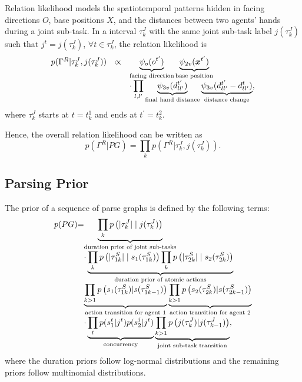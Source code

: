 \documentclass[letterpaper, 10 pt, conference]{ieeeconf}  %
\def \xb{\bm{x}} %
\begin{document}
Relation likelihood models the spatiotemporal patterns hidden in facing directions $O$, base positions $X$, and the distances between two agents' hands during a joint sub-task. In a interval $\tau_k^J$ with the same joint sub-task label $j(\tau_k^J)$ such that $j^t = j(\tau_k^J)$, $\forall t \in \tau_k^J$, the relation likelihood is
\begin{equation}
\begin{array}{lcl}
\setlength{\arraycolsep}{0pt}
p(\Gamma^R | \tau_k^J, j(\tau_k^J)) &\propto& \displaystyle \underbrace{\psi_{o}(o^{t^\prime})}_{\text{facing direction}} \underbrace{\psi_{2v}(\xb^{t^\prime})}_{\text{base position}}\\
&& \displaystyle \cdot \prod_{l,l^\prime}\underbrace{\psi_{3v}(d_{ll^\prime}^{t^\prime})}_{\text{final hand distance}}\underbrace{\psi_{3v}(d_{ll^\prime}^{t^\prime} - d_{ll^\prime}^{t})}_{\text{distance change}},
\end{array}
\label{eq:relation_ll_interval}
\end{equation}
where $\tau^J_{k}$ starts at $t = t_k^1$ and ends at $t^\prime = t_k^2$.

Hence, the overall relation likelihood can be written as
\begin{equation}
p(\Gamma^R | PG) = \prod_k p(\Gamma^R | \tau_k^J, j(\tau_k^J)).
\end{equation}

\subsection{Parsing Prior}

The prior of a sequence of parse graphs is defined by the following terms:
\begin{equation}
\setlength{\arraycolsep}{0pt}
\begin{array}{lcl}
p(PG)&=& \underbrace{\prod_k p\left(|\tau_k^J| \mid j(\tau_k^J)\right)}_{\text{duration prior of joint sub-tasks}}\\
&& \cdot \underbrace{\prod_k p\left(|\tau_{1k}^S| \mid s_1(\tau_{1k}^S)\right) \prod_k p\left(|\tau_{2k}^S| \mid s_2(\tau_{2k}^S)\right)}_{\text{duration prior of atomic actions}}\\
&& \displaystyle \underbrace{\prod_{k > 1}p\left(s_1(\tau_{1k}^S) | s(\tau_{1k-1}^S)\right)}_{\text{action transition for agent 1}}\underbrace{\prod_{k > 1}p\left(s_2(\tau_{2k}^S) | s(\tau_{2k-1}^S)\right)}_{\text{action transition for agent 2}}\\
&& \cdot  \underbrace{\prod_{t}p(s_1^t | j^t)p(s_2^j | j^t)}_{\text{concurrency}} \underbrace{\prod_{k > 1}p\left(j(\tau_k^J) | j(\tau_{k-1}^J)\right)}_{\text{joint sub-task transition}},\\
\end{array}
\label{eq:prior}
\end{equation}
where the duration priors follow log-normal distributions and the remaining priors follow multinomial distributions.
\end{document}
